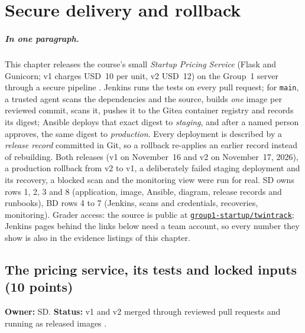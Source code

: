 \chapter{Secure delivery and rollback}

\paragraph{In one paragraph.} This chapter releases the course's small \emph{Startup Pricing Service} (Flask and Gunicorn; v1 charges USD~10 per unit, v2 USD~12)
on the Group~1 server through a secure pipeline \cite{DosManualV143}. Jenkins runs the tests on every pull request; for \texttt{main}, a trusted agent scans the dependencies and the source, builds \emph{one} image per reviewed commit,
scans it, pushes it to the Gitea container registry and records its digest; Ansible deploys that exact digest to \emph{staging}, and after a named person approves, the same digest to \emph{production}.
Every deployment is described by a \emph{release record} committed in Git, so a rollback re-applies an earlier record instead of rebuilding. Both releases (v1 on November~16 and v2 on November~17, 2026),
a production rollback from v2 to v1, a deliberately failed staging deployment and its recovery, a blocked scan and the monitoring view were run for real. SD owns rows 1, 2, 3 and 8 (application, image, Ansible,
diagram, release records and runbooks), BD rows 4 to 7 (Jenkins, scans and credentials, recoveries, monitoring). Grader access: the source is public at
\href{\GiteaRepoURL}{\texttt{group1-startup/twintrack}}; Jenkins pages behind the links below need a team account, so every number they show is also in the evidence listings of this chapter.

\section{The pricing service, its tests and locked inputs (10 points)}\label{Section:deliveryService}
\textbf{Owner:} SD. \textbf{Status:} v1 and v2 merged through reviewed pull requests and running as released images \StatusPass.

